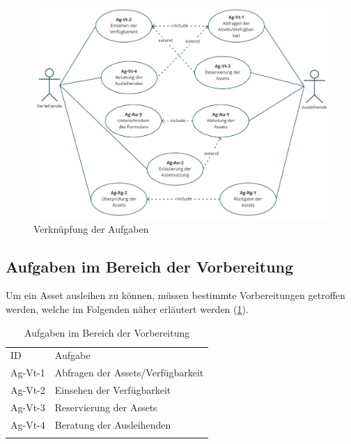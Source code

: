 \begin{figure}[h]
        \centering
        \includegraphics[scale=0.45]{Bilder/usecase1.pdf}
        \caption{Verknüpfung der Aufgaben}
        \label{fig:usecase}
    \end{figure}
    

\subsection{Aufgaben im Bereich der Vorbereitung}
Um ein Asset ausleihen zu können, müssen bestimmte Vorbereitungen getroffen
werden, welche im Folgenden näher erläutert werden (\ref{table:Ag-Vt}).

\begin{table}[h]
        \centering
        \caption{Aufgaben im Bereich der Vorbereitung}
        \begin{tabular}{ll}
                \arrayrulecolor{maincolor}\hline
                \sffamily\color{maincolor}ID & \sffamily\color{maincolor}Aufgabe
                \\
                \arrayrulecolor{maincolor}\hline
                Ag-Vt-1                      & Abfragen der Assets/Verfügbarkeit
                \\
                Ag-Vt-2                      & Einsehen der Verfügbarkeit
                \\
                Ag-Vt-3                      & Reservierung der Assets
                \\
                Ag-Vt-4                      & Beratung der Ausleihenden
                \\
                \arrayrulecolor{maincolor}\hline
        \end{tabular}
        \label{table:Ag-Vt}
\end{table}

